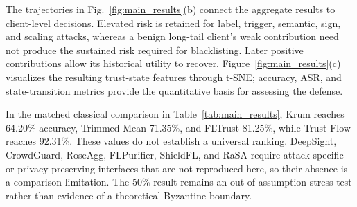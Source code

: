 \documentclass[conference,compsoc]{IEEEtran}
\begin{document}
The trajectories in Fig.~\ref{fig:main_results}(b) connect the aggregate results to client-level decisions. Elevated risk is retained for label, trigger, semantic, sign, and scaling attacks, whereas a benign long-tail client's weak contribution need not produce the sustained risk required for blacklisting. Later positive contributions allow its historical utility to recover. Figure~\ref{fig:main_results}(c) visualizes the resulting trust-state features through t-SNE; accuracy, ASR, and state-transition metrics provide the quantitative basis for assessing the defense.

In the matched classical comparison in Table~\ref{tab:main_results}, Krum reaches 64.20\% accuracy, Trimmed Mean 71.35\%, and FLTrust 81.25\%, while Trust Flow reaches 92.31\%. These values do not establish a universal ranking. DeepSight, CrowdGuard, RoseAgg, FLPurifier, ShieldFL, and RaSA require attack-specific or privacy-preserving interfaces that are not reproduced here, so their absence is a comparison limitation. The 50\% result remains an out-of-assumption stress test rather than evidence of a theoretical Byzantine boundary.
\end{document}
